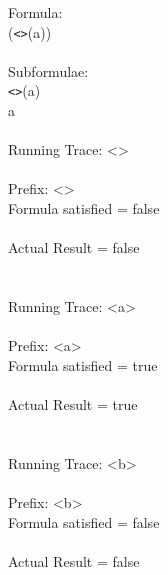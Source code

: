 Formula:\\
(\texttt{\textless \textgreater}(a))\\
\\
Subformulae:\\
\texttt{\textless \textgreater}(a)\\
a\\
\\
Running Trace: \textless \textgreater\\
\\
  Prefix: \textless \textgreater\\
  Formula satisfied = false\\
\\
  Actual Result = false\\
\\
\\
Running Trace: \textless a\textgreater\\
\\
  Prefix: \textless a\textgreater\\
  Formula satisfied = true\\
\\
  Actual Result = true\\
\\
\\
Running Trace: \textless b\textgreater\\
\\
  Prefix: \textless b\textgreater\\
  Formula satisfied = false\\
\\
  Actual Result = false\\

\newpage

